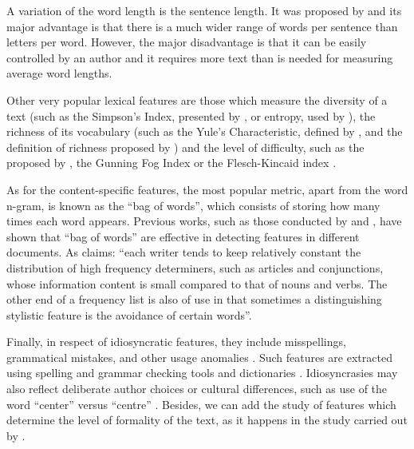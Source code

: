 A variation of the word length is the sentence length. It was proposed by \cite{yule1939sentence} and its major advantage is that there is a much wider range of words per sentence than letters per word. However, the major disadvantage is that it can be easily controlled by an author and it requires more text than is needed for measuring average word lengths.

Other very popular lexical features are those which measure the diversity of a text (such as the Simpson's Index, presented by \cite{simpson1949measurement}, or entropy, used by \cite{holmes1985analysis}), the richness of its vocabulary (such as the Yule's Characteristic, defined by \cite{yule2014statistical}, and the definition of richness proposed by \cite{honore1979some}) and the level of difficulty, such as the proposed by \cite{dale1948formula}, the Gunning Fog Index \citep{wiki:gunning} or the Flesch-Kincaid index \citep{dubay2004principles}.

As for the content-specific features, the most popular metric, apart from the word n-gram, is known as the ``bag of words'', which consists of storing how many times each word appears. Previous works, such as those conducted by \cite{mihalcea2009lie} and \cite{ott2011finding}, have shown that ``bag of words'' are effective in detecting features in different documents. As \cite{allen1974methods} claims: ``each writer tends to keep relatively constant the distribution of high frequency determiners, such as articles and conjunctions, whose information content is small compared to that of nouns and verbs. The other end of a frequency list is also of use in that sometimes a distinguishing stylistic feature is the avoidance of certain words''.

Finally, in respect of idiosyncratic features, they include misspellings, grammatical mistakes, and other usage anomalies \citep{abbasi2008writeprints}. Such features are extracted using spelling and grammar checking tools and dictionaries \citep{chaski2001empirical}. Idiosyncrasies may also reflect deliberate author choices or cultural differences, such as use of the word ``center'' versus ``centre'' \citep{koppel2003exploiting}. Besides, we can add the study of features which determine the level of formality of the text, as it happens in the study carried out by \cite{sheika2012learning}.